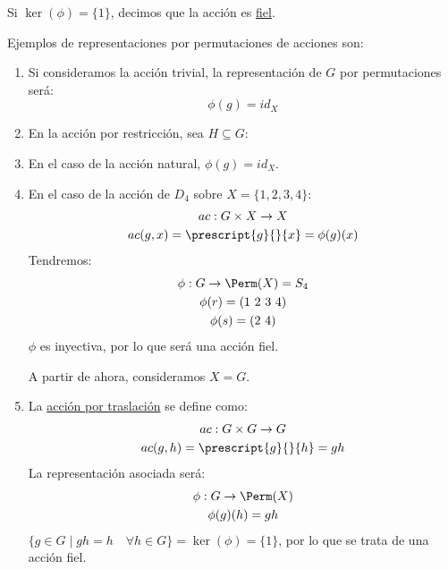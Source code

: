 \begin{definicion}
    Si $\ker(\phi) = \{1\}$, decimos que la acción es \underline{fiel}.
\end{definicion}

\begin{ejemplo}
    Ejemplos de representaciones por permutaciones de acciones son:
    \begin{enumerate}
        \item Si consideramos la acción trivial, la representación de $G$ por permutaciones será:
            \begin{equation*}
                \phi(g) = id_X
            \end{equation*}
        \item En la acción por restricción, sea $H\subseteq G$:
            \begin{figure}[H]
                \centering
            \end{figure}
        \item En el caso de la acción natural, $\phi(g) = id_X$.
        \item En el caso de la acción de $D_4$ sobre $X = \{1,2,3,4\}$:
            \begin{gather*}
                ac:G\times X \to X \\
                ac(g,x) = \prescript{g}{}{x} = \phi(g)(x)
            \end{gather*}
            Tendremos:
            \begin{gather*}
                \phi:G\to\Perm(X) = S_4 \\
                \phi(r) = (1\ 2\ 3\ 4) \\
                \phi(s) = (2\ 4)
            \end{gather*}
            $\phi$ es inyectiva, por lo que será una acción fiel.

            A partir de ahora, consideramos $X = G$.
        \item La \underline{acción por traslación} se define como:
            \begin{gather*}
                ac:G\times G \to G \\
                ac(g,h) = \prescript{g}{}{h} = gh
            \end{gather*}
            La representación asociada será:
            \begin{gather*}
                \phi:G\to\Perm(X) \\
                \phi(g)(h) = gh
            \end{gather*}
            $\{g\in G\mid gh = h \quad \forall h\in G\} = \ker(\phi) = \{1\}$, por lo que se trata de una acción fiel.
    \end{enumerate}
\end{ejemplo}

